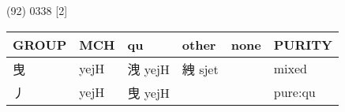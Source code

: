 \documentclass[14pt,a4paper]{scrartcl}
\begin{document}
(92) 0338 {[}2{]}

\begin{longtable}[c]{@{}llllll@{}}
\toprule
\begin{minipage}[b]{0.14\columnwidth}\raggedright\strut
GROUP
\strut\end{minipage} &
\begin{minipage}[b]{0.14\columnwidth}\raggedright\strut
MCH
\strut\end{minipage} &
\begin{minipage}[b]{0.14\columnwidth}\raggedright\strut
qu
\strut\end{minipage} &
\begin{minipage}[b]{0.14\columnwidth}\raggedright\strut
other
\strut\end{minipage} &
\begin{minipage}[b]{0.14\columnwidth}\raggedright\strut
none
\strut\end{minipage} &
\begin{minipage}[b]{0.14\columnwidth}\raggedright\strut
PURITY
\strut\end{minipage}\tabularnewline
\midrule
\endhead
\begin{minipage}[t]{0.14\columnwidth}\raggedright\strut
曳
\strut\end{minipage} &
\begin{minipage}[t]{0.14\columnwidth}\raggedright\strut
yejH
\strut\end{minipage} &
\begin{minipage}[t]{0.14\columnwidth}\raggedright\strut
洩 yejH
\strut\end{minipage} &
\begin{minipage}[t]{0.14\columnwidth}\raggedright\strut
絏 sjet
\strut\end{minipage} &
\begin{minipage}[t]{0.14\columnwidth}\raggedright\strut
\strut\end{minipage} &
\begin{minipage}[t]{0.14\columnwidth}\raggedright\strut
mixed
\strut\end{minipage}\tabularnewline
\begin{minipage}[t]{0.14\columnwidth}\raggedright\strut
丿
\strut\end{minipage} &
\begin{minipage}[t]{0.14\columnwidth}\raggedright\strut
yejH
\strut\end{minipage} &
\begin{minipage}[t]{0.14\columnwidth}\raggedright\strut
曳 yejH
\strut\end{minipage} &
\begin{minipage}[t]{0.14\columnwidth}\raggedright\strut
\strut\end{minipage} &
\begin{minipage}[t]{0.14\columnwidth}\raggedright\strut
\strut\end{minipage} &
\begin{minipage}[t]{0.14\columnwidth}\raggedright\strut
pure:qu
\strut\end{minipage}\tabularnewline
\bottomrule
\end{longtable}
\end{document}
